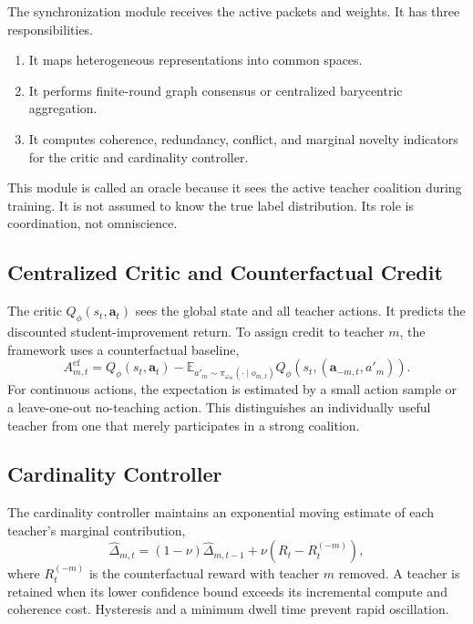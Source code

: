\documentclass[10pt,twocolumn,a4paper]{article}
\newcommand{\E}{\mathbb{E}}
\begin{document}
The synchronization module receives the active packets and weights. It has three responsibilities.

\begin{enumerate}
    \item It maps heterogeneous representations into common spaces.
    \item It performs finite-round graph consensus or centralized barycentric aggregation.
    \item It computes coherence, redundancy, conflict, and marginal novelty indicators for the critic and cardinality controller.
\end{enumerate}

This module is called an oracle because it sees the active teacher coalition during training. It is not assumed to know the true label distribution. Its role is coordination, not omniscience.

\subsection{Centralized Critic and Counterfactual Credit}

The critic \(Q_\phi(s_t,\bm a_t)\) sees the global state and all teacher actions. It predicts the discounted student-improvement return. To assign credit to teacher \(m\), the framework uses a counterfactual baseline,
\begin{equation}
 A_{m,t}^{\mathrm{cf}}
 =Q_\phi(s_t,\bm a_t)
 -\E_{a'_m\sim\pi_{\omega_m}(\cdot\mid o_{m,t})}
 Q_\phi(s_t,(\bm a_{-m,t},a'_m)).
\label{eq:comaadvantage}
\end{equation}
For continuous actions, the expectation is estimated by a small action sample or a leave-one-out no-teaching action. This distinguishes an individually useful teacher from one that merely participates in a strong coalition.

\subsection{Cardinality Controller}

The cardinality controller maintains an exponential moving estimate of each teacher's marginal contribution,
\begin{equation}
 \widehat{\Delta}_{m,t}
 =(1-\nu)\widehat{\Delta}_{m,t-1}
 +\nu\left(R_t-R_t^{(-m)}\right),
\label{eq:marginalema}
\end{equation}
where \(R_t^{(-m)}\) is the counterfactual reward with teacher \(m\) removed. A teacher is retained when its lower confidence bound exceeds its incremental compute and coherence cost. Hysteresis and a minimum dwell time prevent rapid oscillation.
\end{document}
